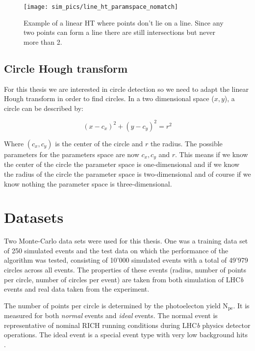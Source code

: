 \documentclass[11pt,twoside]{scrreprt}
\begin{document}
\begin{figure}[tb]
  \centering
  \texttt{[image: sim\_pics/line\_ht\_paramspace\_nomatch]}
  \caption[Example of a linear HT where points don't lie on a line]{Example of a linear HT where points don't lie on a line. Since any 
  two points can form a line there are still intersections but never more than 2.}
  \label{fig:line_ht_nomatch}
\end{figure}

\subsection{Circle Hough transform} %
\label{sub:circle_hough_transform}

For this thesis we are interested in circle detection so we need to adapt the linear Hough transform in order to find circles. 
In a two dimensional space ($x,y$), a circle can be described by:

\begin{equation}
		(x-c_x)^2 + (y-c_y)^2 = r^2
\end{equation}

Where $(c_x,c_y)$ is the center of the circle and $r$ the radius. The possible parameters for the parameters space are now $c_x, c_y$ 
and $r$. This means if we know the center of the circle the parameter space is one-dimensional and if we know the radius of the circle 
the parameter space is two-dimensional and of course if we know nothing the parameter space is three-dimensional.




\section{Datasets} %
\label{sec:dataset}
Two Monte-Carlo data sets were used for this thesis. One was a training data set of 250 simulated events and the test data on which the performance 
of the algorithm was tested, consisting of 10'000 simulated events with a total of 49'979 circles across all events. The properties of 
these events (radius, number of points per circle, number of circles per event) are taken from both simulation of LHC\textit{b} events and
real data taken from the experiment.

The number of points per circle is determined by the photoelecton yield N$_\text{pe}$. It is measured for both \emph{normal} events 
and \emph{ideal} events. The normal event is representative of nominal RICH running conditions during LHC\textit{b} physics detector 
operations. The ideal event is a special event type with very low background hits \cite{RICHPerf2012}.
\end{document}
